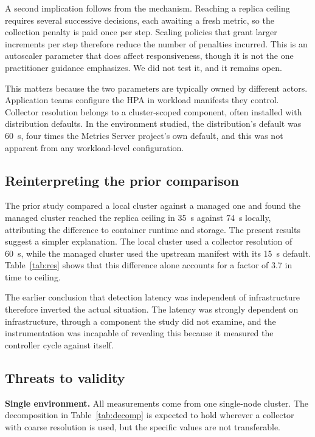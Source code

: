 \documentclass[conference]{IEEEtran}
\begin{document}
A second implication follows from the mechanism. Reaching a replica ceiling
requires several successive decisions, each awaiting a fresh metric, so the
collection penalty is paid once per step. Scaling policies that grant larger
increments per step therefore reduce the number of penalties incurred. This is
an autoscaler parameter that does affect responsiveness, though it is not the
one practitioner guidance emphasizes. We did not test it, and it remains open.

This matters because the two parameters are typically owned by different actors.
Application teams configure the HPA in workload manifests they control.
Collector resolution belongs to a cluster-scoped component, often installed with
distribution defaults. In the environment studied, the distribution's default
was 60~s, four times the Metrics Server project's own default, and this was not
apparent from any workload-level configuration.

\subsection{Reinterpreting the prior comparison}

The prior study compared a local cluster against a managed one and found the
managed cluster reached the replica ceiling in 35~s against 74~s locally,
attributing the difference to container runtime and storage. The present results
suggest a simpler explanation. The local cluster used a collector resolution of
60~s, while the managed cluster used the upstream manifest with its 15~s
default. Table~\ref{tab:res} shows that this difference alone accounts for a
factor of 3.7 in time to ceiling.

The earlier conclusion that detection latency was independent of infrastructure
therefore inverted the actual situation. The latency was strongly dependent on
infrastructure, through a component the study did not examine, and the
instrumentation was incapable of revealing this because it measured the
controller cycle against itself.

\subsection{Threats to validity}

\textbf{Single environment.} All measurements come from one single-node cluster.
The decomposition in Table~\ref{tab:decomp} is expected to hold wherever a
collector with coarse resolution is used, but the specific values are not
transferable.
\end{document}
